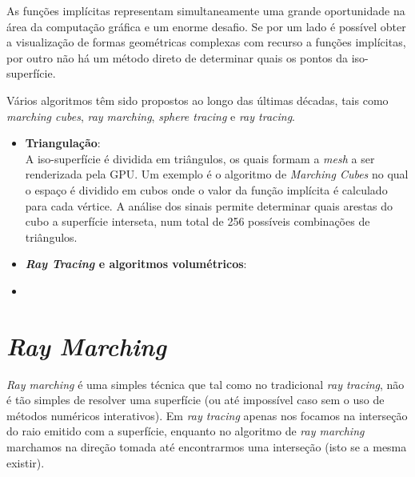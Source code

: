 As funções implícitas representam simultaneamente uma grande oportunidade na área da computação gráfica e um enorme desafio. Se por um lado é possível obter a visualização de formas geométricas complexas com recurso a funções implícitas, por outro não há um método direto de determinar quais os pontos da iso-superfície.

Vários algoritmos têm sido propostos ao longo das últimas décadas, tais como \textit{marching cubes}\cite{Lorensen1987}, \textit{ray marching}, \textit{sphere tracing}\cite{Hart1996} e \textit{ray tracing}.

\begin{itemize}
	
	\item \textbf{Triangulação}:\\
	A iso-superfície é dividida em triângulos, os quais formam a \textit{mesh} a ser renderizada pela \ac{GPU}. Um exemplo é o algoritmo de \textit{Marching Cubes}\cite{Lorensen1987} no qual o espaço é dividido em cubos onde o valor da função implícita é calculado para cada vértice. A análise dos sinais permite determinar quais arestas do cubo a superfície interseta, num total de 256 possíveis combinações de triângulos.
	
	\item \textbf{\textit{Ray Tracing} e algoritmos volumétricos}:\\
    
	
	\item {}
\end{itemize}


\section{\emph{Ray Marching}}
\label{sec::arte:raymarch}


\textit{Ray marching} é uma simples técnica que tal como no tradicional \textit{ray tracing}, não é tão simples de resolver uma superfície (ou até impossível caso sem o uso de métodos numéricos interativos). Em \textit{ray tracing} apenas nos focamos na interseção do raio emitido com a superfície, enquanto no algoritmo de \textit{ray marching} marchamos na direção tomada até encontrarmos uma interseção (isto se a mesma existir).\\

